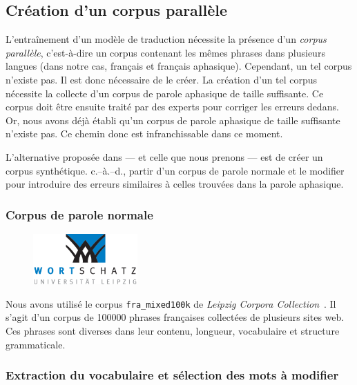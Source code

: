 \subsection{Création d'un corpus parallèle}

L'entraînement d'un modèle de traduction nécessite la présence d'un \emph{corpus parallèle}, 
c'est-à-dire un corpus contenant les mêmes phrases dans plusieurs langues 
(dans notre cas, français et français aphasique).
Cependant, un tel corpus n'existe pas. 
Il est donc nécessaire de le créer.
La création d'un tel corpus nécessite la collecte d'un corpus de parole aphasique de taille suffisante.
Ce corpus doit être ensuite traité par des experts pour corriger les erreurs dedans.
Or, nous avons déjà établi qu'un corpus de parole aphasique de taille suffisante n'existe pas.
Ce chemin donc est infranchissable dans ce moment.

L'alternative proposée dans \cite{Smaili_Langlois_Pribil_2022} --- et celle que nous prenons --- 
est de créer un corpus synthétique.
c.--à.--d., partir d'un corpus de parole normale et le modifier pour introduire 
des erreurs similaires à celles trouvées dans la parole aphasique.

\subsubsection{Corpus de parole normale}

\begin{figure}
    \centering
    \includegraphics[width=4cm]{assets/images/ws.png}
\end{figure}

Nous avons utilisé le corpus \texttt{fra\_mixed100k} de 
\emph{\foreignlanguage{english}{Leipzig Corpora Collection}}~\cite{Goldhahn_Eckart_Quasthoff}.
Il s'agit d'un corpus de 100000 phrases françaises collectées de plusieurs sites web.
Ces phrases sont diverses dans leur contenu, longueur, vocabulaire et structure grammaticale.

\subsubsection{Extraction du vocabulaire et sélection des mots à modifier}

